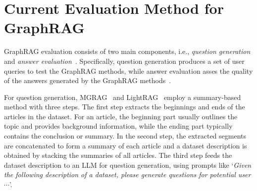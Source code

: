 

\section{Current Evaluation Method for GraphRAG}

GraphRAG evaluation consists of two main components, i.e.,  \textit{question generation} and \textit{answer evaluation}~\cite{yu2024evaluation}. 
Specifically, question generation produces a set of user queries to test the GraphRAG methods, while answer evaluation asses the quality of the answers generated by the GraphRAG methods~\cite{salemi2024evaluating}.

For question generation, MGRAG~\cite{edge2024local} and LightRAG~\cite{guo2024lightrag} employ a summary-based method with three steps. 
The first step extracts the beginnings and ends of the articles in the dataset. 
For an article, the beginning part usually outlines the topic and provides background information, while the ending part typically contains the conclusion or summary.
In the second step, the extracted segments are concatenated to form a summary of each article and a dataset description is obtained by stacking the summaries of all articles.
The third step feeds the dataset description to an LLM for question generation, using prompts like `\textit{Given the following description of a dataset, please generate questions for potential user $\cdots$}'. 




